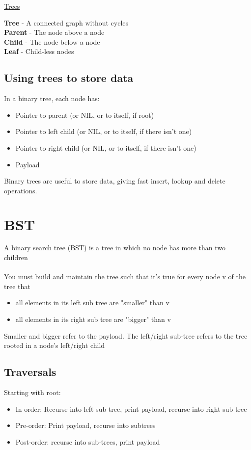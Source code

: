 \documentclass{article}[18pt]
\begin{document}
\begin{center}
\underline{\huge Trees}
\end{center}
\textbf{Tree} - A connected graph without cycles\\
\textbf{Parent} - The node above a node\\
\textbf{Child} - The node below a node\\
\textbf{Leaf} - Child-less nodes
\subsection{Using trees to store data}
In a binary tree, each node has:
\begin{itemize}
	\item Pointer to parent (or NIL, or to itself, if root)
	\item Pointer to left child (or NIL, or to itself, if there isn't one)
	\item Pointer to right child (or NIL, or to itself, if there isn't one)
	\item Payload
\end{itemize}
Binary trees are useful to store data, giving fast insert, lookup and delete operations.
\section{BST}
A binary search tree (BST) is a tree in which no node has more than two children\\
\\
You must build and maintain the tree such that it's true for every node v of the tree that
\begin{itemize}
	\item all elements in its left sub tree are "smaller" than v
	\item all elements in its right sub tree are "bigger" than v
\end{itemize}
Smaller and bigger refer to the payload. The left/right sub-tree refers to the tree rooted in a node's left/right child
\subsection{Traversals}
Starting with root:
\begin{itemize}
	\item In order: Recurse into left sub-tree, print payload, recurse into right sub-tree
	\item Pre-order: Print payload, recurse into subtrees
	\item Post-order: recurse into sub-trees, print payload
\end{itemize}
\end{document}
